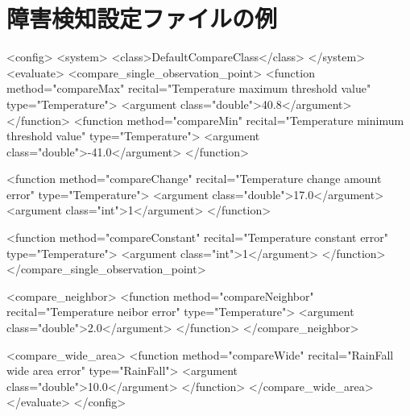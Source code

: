 
\section{障害検知設定ファイルの例}

\makeendnotes

{\small
\begin{verbatimtab}
<config>
<system>
<class>DefaultCompareClass</class>
</system>
<evaluate>
<compare_single_observation_point>
<function method="compareMax" recital="Temperature maximum threshold value"
type="Temperature"> <argument class="double">40.8</argument>
</function>
<function method="compareMin" recital="Temperature minimum threshold value"
type="Temperature"> <argument class="double">-41.0</argument>
</function>

<function method="compareChange" recital="Temperature change amount error"
type="Temperature"> <argument class="double">17.0</argument>
<argument class="int">1</argument>
</function>

<function method="compareConstant" recital="Temperature constant error"
type="Temperature"> <argument class="int">1</argument>
</function>
</compare_single_observation_point>

<compare_neighbor>
<function method="compareNeighbor" recital="Temperature neibor error"
type="Temperature"> <argument class="double">2.0</argument>
</function>
</compare_neighbor>

<compare_wide_area>
<function method="compareWide" recital="RainFall wide area error"
type="RainFall"> <argument class="double">10.0</argument>
</function>
</compare_wide_area>
</evaluate>
</config>
\end{verbatimtab}
}

\putendnotes

